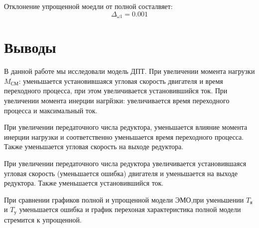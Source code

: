 \documentclass[a4paper, 12pt]{article}
\begin{document}
Отклонение упрощенной моедли от полной состалвяет:
\begin{equation}
    \Delta_{\omega1} = 0.001
\end{equation}

\newpage
\section*{\centering Выводы}
В данной работе мы исследовали модель ДПТ. При увеличении момента нагрузки $M_\text{СМ}$: уменьшается установившаяся угловая скорость двигателя и время переходного процесса, при этом увеличивается установившийся ток. При увеличении момента инерции нагрйзки: увеличивается время переходного процесса и максимальный ток. \par
При увеличении передаточного числа редуктора, уменьшается влияние момента инерции нагрузки и соответственно уменьшается время переходного процесса. Также уменьшается угловая скорость на выходе редуктора. \par
При увеличении передаточного числа редуктора увеличивается установившаяся угловая скорость (уменьшается ошибка) двигателя и уменьшается на выходе редуктора. Также уменьшается установившийся ток. \par
При сравнении графиков полной и упрощенной модели ЭМО,при уменьшении $T_\text{я}$ и $T_\text{у}$ уменьшается ошибка и график перехоная характеристика полной модели стремится к упрощенной. \par
\end{document}
